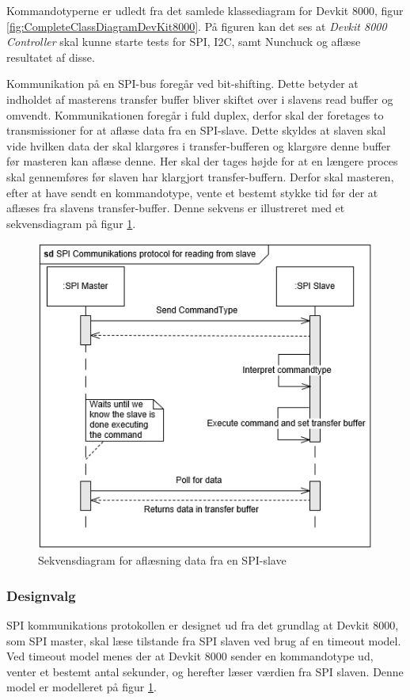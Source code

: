 \noindent Kommandotyperne er udledt fra det samlede klassediagram for Devkit 8000, figur \ref{fig:CompleteClassDiagramDevKit8000}. På figuren kan det ses at \textit{Devkit 8000 Controller} skal kunne starte tests for SPI, I2C, samt Nunchuck og aflæse resultatet af disse. \newline

\noindent Kommunikation på en SPI-bus foregår ved bit-shifting. Dette betyder at indholdet af masterens transfer buffer bliver skiftet over i slavens read buffer og omvendt. Kommunikationen foregår i fuld duplex, derfor skal der foretages to transmissioner for at aflæse data fra en SPI-slave. Dette skyldes at slaven skal vide hvilken data der skal klargøres i transfer-bufferen og klargøre denne buffer før masteren kan aflæse denne. Her skal der tages højde for at en længere proces skal gennemføres før slaven har klargjort transfer-buffern. Derfor skal masteren, efter at have sendt en kommandotype, vente et bestemt stykke tid før der at aflæses fra slavens transfer-buffer. Denne sekvens er illustreret med et sekvensdiagram på figur \ref{figure:SDSpiSlaveRead}.
\begin{figure}[H]
	\centering
	\includegraphics[]{Systemarkitektur/images/SDSpiSlaveRead}
	\caption{Sekvensdiagram for aflæsning data fra en SPI-slave}
	\label{figure:SDSpiSlaveRead}
\end{figure} 

\subsubsection{Designvalg}
SPI kommunikations protokollen er designet ud fra det grundlag at Devkit 8000, som SPI master, skal læse tilstande fra SPI slaven ved brug af en timeout model. Ved timeout model menes der at Devkit 8000 sender en kommandotype ud, venter et bestemt antal sekunder, og herefter læser værdien fra SPI slaven. Denne model er modelleret på figur \ref{figure:SDSpiSlaveRead}.\newline

